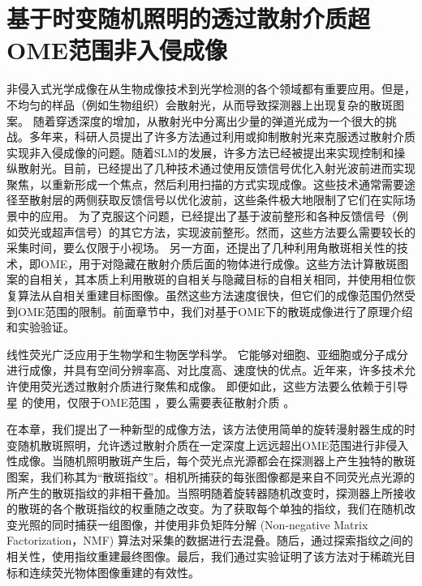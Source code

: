 \chapter{基于时变随机照明的透过散射介质超OME范围非入侵成像}\label{chap:5}

非侵入式光学成像在从生物成像技术\cite{zhao_non-invasive_2001,artzi_vivo_2011}到光学检测\cite{kozloff_non-invasive_2009}的各个领域都有重要应用。但是，不均匀的样品（例如生物组织）会散射光，从而导致探测器上出现复杂的散斑图案\cite{Goodman1976,Bender}。
随着穿透深度的增加，从散射光中分离出少量的弹道光成为一个很大的挑战\cite{Abramson1978,huang_optical_1991}。多年来，科研人员提出了许多方法通过利用或抑制散射光来克服透过散射介质实现非入侵成像的问题。随着SLM的发展，许多方法已经被提出来实现控制和操纵散射光\cite{Mosk2012,rotter_light_2017}。目前，已经提出了几种技术通过使用反馈信号优化入射光波前进而实现聚焦，以重新形成一个焦点，然后利用扫描的方式实现成像\cite{Vellekoop2007,Horstmeyer2015}。这些技术通常需要途径至散射层的两侧获取反馈信号以优化波前，这些条件极大地限制了它们在实际场景中的应用。
为了克服这个问题，已经提出了基于波前整形和各种反馈信号（例如荧光或超声信号）的其它方法\cite{Horstmeyer2015,Katz2019,Popoff2010,Hofer2019}，实现波前整形。然而，这些方法要么需要较长的采集时间，要么仅限于小视场。
另一方面，还提出了几种利用角散斑相关性的技术\cite{bertolotti_non-invasive_2012,katz_non-invasive_2014}，即OME\cite{Freund1988,Yllmaz2019,Osnabrugge}，用于对隐藏在散射介质后面的物体进行成像。这些方法计算散斑图案的自相关，其本质上利用散斑的自相关与隐藏目标的自相关相同，并使用相位恢复算法从自相关重建目标图像。虽然这些方法速度很快，但它们的成像范围仍然受到OME范围的限制。前面章节中，我们对基于OME下的散斑成像进行了原理介绍和实验验证。

线性荧光广泛应用于生物学和生物医学科学\cite{Ruan2020,Lichtman2005,mangeat_super_resolved_2021}。 它能够对细胞、亚细胞或分子成分进行成像，并具有空间分辨率高、对比度高、速度快的优点。近年来，许多技术允许使用荧光透过散射介质进行聚焦和成像。
即便如此，这些方法要么依赖于引导星 \cite{Hhorstmeyer} 的使用，仅限于OME范围 \cite{hofer_wide_2018}，要么需要表征散射介质 \cite{boniface_non_invasive_2020}。

在本章，我们提出了一种新型的成像方法，该方法使用简单的旋转漫射器生成的时变随机散斑照明，允许透过散射介质在一定深度上远远超出OME范围进行非侵入性成像。当随机照明散斑产生后，每个荧光点光源都会在探测器上产生独特的散斑图案，我们称其为“散斑指纹”。相机所捕获的每张图像都是来自不同荧光点光源的所产生的散斑指纹的非相干叠加。当照明随着旋转器随机改变时，探测器上所接收的散斑的各个散斑指纹的权重随之改变。为了获取每个单独的指纹，我们在随机改变光照的同时捕获一组图像，并使用非负矩阵分解 (Non-negative Matrix Factorization，NMF) 算法对采集的数据进行去混叠。随后，通过探索指纹之间的相关性，使用指纹重建最终图像。最后，我们通过实验证明了该方法对于稀疏光目标和连续荧光物体图像重建的有效性。

